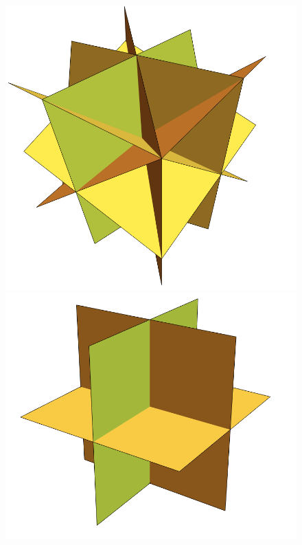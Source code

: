 \documentclass{amsart}
\theoremstyle{definition}
\begin{document}
\begin{figure}[p]
	\centerline{
		\includegraphics[scale=.3]{HypSimplex.png}
		\includegraphics[scale=.35]{HypCube.png}
        \ \
}
\end{figure}
\end{document}

